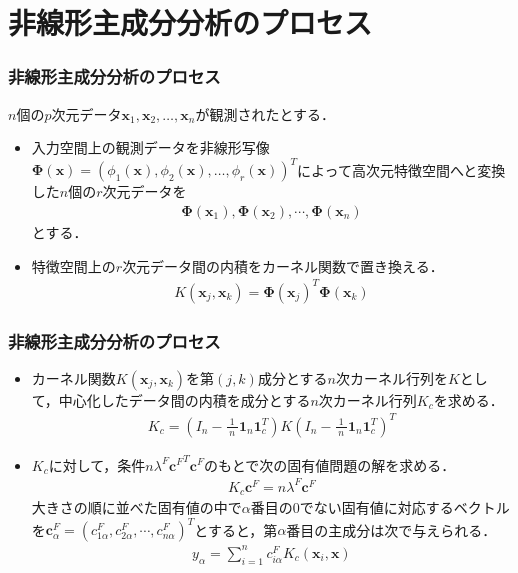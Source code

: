 \documentclass[dvipdfmx,cjk]{beamer}
\theoremstyle{example}
\begin{document}
\section{非線形主成分分析のプロセス}
\begin{frame}
    \frametitle{非線形主成分分析のプロセス}
    $n$個の$p$次元データ$\boldsymbol{x}_1,\boldsymbol{x}_2,\dots,\boldsymbol{x}_n$が観測されたとする．
    \begin{itemize}
        \item 入力空間上の観測データを非線形写像$\boldsymbol{\Phi}(\boldsymbol{x})=\left(\phi_1(\boldsymbol{x}),\phi_2(\boldsymbol{x}),\dots,\phi_r(\boldsymbol{x})\right)^T$によって高次元特徴空間へと変換した$n$個の$r$次元データを
              \begin{align*}
                  \boldsymbol{\Phi}(\boldsymbol{x}_1),\boldsymbol{\Phi}(\boldsymbol{x}_2),\cdots,\boldsymbol{\Phi}(\boldsymbol{x}_n)
              \end{align*}とする．
        \item 特徴空間上の$r$次元データ間の内積をカーネル関数で置き換える．
              \begin{align*}
                  K(\boldsymbol{x}_j,\boldsymbol{x}_k)={\boldsymbol{\Phi}(\boldsymbol{x}_j)}^T\boldsymbol{\Phi}(\boldsymbol{x}_k)
              \end{align*}
    \end{itemize}
\end{frame}
\begin{frame}
    \frametitle{非線形主成分分析のプロセス}
    \begin{itemize}
        \item カーネル関数$K(\boldsymbol{x}_j,\boldsymbol{x}_k)$を第$(j,k)$成分とする$n$次カーネル行列を$K$として，中心化したデータ間の内積を成分とする$n$次カーネル行列$K_c$を求める．
              \begin{align*}
                  K_c=\left(I_n-\frac{1}{\;n\;}\boldsymbol{1}_n\boldsymbol{1}_c^T\right)K\left(I_n-\frac{1}{\;n\;}\boldsymbol{1}_n\boldsymbol{1}_c^T\right)^T
              \end{align*}
        \item $K_c$に対して，条件$n\lambda^F{\boldsymbol{c}^F}^T\boldsymbol{c}^F$のもとで次の固有値問題の解を求める．
              \begin{align*}
                  K_c\boldsymbol{c}^F=n\lambda^F\boldsymbol{c}^F
              \end{align*}
              大きさの順に並べた固有値の中で$\alpha$番目の$0$でない固有値に対応するベクトルを$\boldsymbol{c}_\alpha^F=(c_{1\alpha}^F,c_{2\alpha}^F,\cdots,c_{n\alpha}^F)^T$とすると，第$\alpha$番目の主成分は次で与えられる．
              \begin{align*}
                  y_\alpha=\sum_{i=1}^{n}c_{i\alpha}^FK_c(\boldsymbol{x}_i,\boldsymbol{x})
              \end{align*}

    \end{itemize}

\end{frame}
\end{document}
